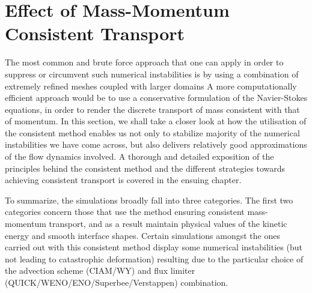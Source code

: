 
\section{Effect of Mass-Momentum Consistent Transport}

The most common and brute force approach that one can apply 
in order to suppress or circumvent such numerical instabilities is 
by using a combination of extremely refined meshes coupled with larger domains
A more computationally efficient approach would be to use a 
conservative formulation
of the Navier-Stokes equations, in order
to render the discrete transport of mass consistent with that of momentum. 
In this section, we shall take a closer look at how the utilisation of 
the consistent method enables us not only to stabilize majority of the numerical
instabilities we have come across, but also delivers relatively good approximations 
of the flow dynamics involved. A thorough and detailed exposition of the principles
behind the consistent method and the different strategies towards achieving consistent
transport is covered in the ensuing chapter.  




To summarize, the simulations broadly fall into three categories. 
The first two categories concern those that use the method ensuring  
consistent mass-momentum transport, and as a result maintain 
physical values of the kinetic energy and smooth interface shapes. 
Certain simulations amongst the ones carried out with this consistent  
method display some numerical instabilities (but not leading 
to catastrophic deformation)
resulting due to the particular choice of 
the advection scheme (CIAM/WY) and 
flux limiter (QUICK/WENO/ENO/Superbee/Verstappen) combination. 

